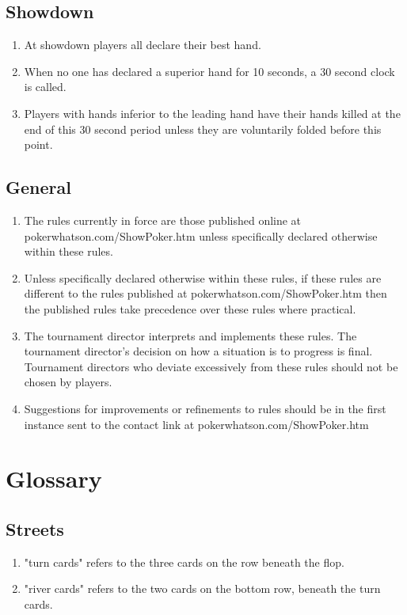 \documentclass[a4paper,12pt]{article}
\begin{document}
\subsection{Showdown}
\begin{enumerate}
\item At showdown players all declare their best hand.
\item When no one has declared a superior hand for 10 seconds, a 30 second clock is called.
\item Players with hands inferior to the leading hand have their hands killed at the end of this 30 second period unless they are voluntarily folded before this point.

\end{enumerate}

\subsection{General}
\begin{enumerate}
\item The rules currently in force are those published online at pokerwhatson.com/ShowPoker.htm unless specifically declared otherwise within these rules.
\item Unless specifically declared otherwise within these rules, if these rules are different to the rules published at pokerwhatson.com/ShowPoker.htm then the published rules take precedence over these rules where practical.
\item The tournament director interprets and implements these rules. The tournament director's decision on how a situation is to progress is final. Tournament directors who deviate excessively from these rules should not be chosen by players.
\item Suggestions for improvements or refinements to rules should be in the first instance sent to the contact link at pokerwhatson.com/ShowPoker.htm


\end{enumerate}

\section{Glossary}
\subsection{Streets}
\begin{enumerate}
\item "turn cards" refers to the three cards on the row beneath the flop.
\item "river cards" refers to the two cards on the bottom row, beneath the turn cards.
\end{enumerate}
\end{document}

